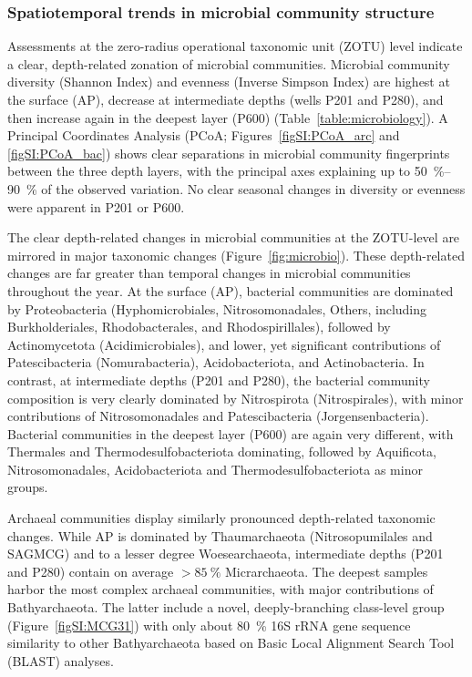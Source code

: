 \subsubsection{Spatiotemporal trends in microbial community structure}
Assessments at the zero-radius operational taxonomic unit (ZOTU) level indicate a clear, depth-related zonation of microbial communities.
Microbial community diversity (Shannon Index) and evenness (Inverse Simpson Index) are highest at the surface (AP), decrease at intermediate depths (wells P201 and P280), and then increase again in the deepest layer (P600) (Table~\ref{table:microbiology}).
A Principal Coordinates Analysis (PCoA; Figures~\ref{figSI:PCoA_arc} and \ref{figSI:PCoA_bac}) shows clear separations in microbial community fingerprints between the three depth layers, with the principal axes explaining up to \SIrange{50}{90}{\percent} of the observed variation.
No clear seasonal changes in diversity or evenness were apparent in P201 or P600.

The clear depth-related changes in microbial communities at the ZOTU-level are mirrored in major taxonomic changes (Figure~\ref{fig:microbio}).
These depth-related changes are far greater than temporal changes in microbial communities throughout the year.
At the surface (AP), bacterial communities are dominated by Proteobacteria (Hyphomicrobiales, Nitrosomonadales, Others, including Burkholderiales, Rhodobacterales, and Rhodospirillales), followed by Actinomycetota (Acidimicrobiales), and lower, yet significant contributions of Patescibacteria (Nomurabacteria), Acidobacteriota, and Actinobacteria.
In contrast, at intermediate depths (P201 and P280), the bacterial community composition is very clearly dominated by Nitrospirota (Nitrospirales), with minor contributions of Nitrosomonadales and Patescibacteria (Jorgensenbacteria).
Bacterial communities in the deepest layer (P600) are again very different, with Thermales and Thermodesulfobacteriota dominating, followed by Aquificota, Nitrosomonadales, Acidobacteriota and Thermodesulfobacteriota as minor groups.

Archaeal communities display similarly pronounced depth-related taxonomic changes.
While AP is dominated by Thaumarchaeota (Nitrosopumilales and SAGMCG) and to a lesser degree Woesearchaeota, intermediate depths (P201 and P280) contain on average $> \SI{85}{\percent}$ Micrarchaeota.
The deepest samples harbor the most complex archaeal communities, with major contributions of Bathyarchaeota.
The latter include a novel, deeply-branching class-level group (Figure~\ref{figSI:MCG31}) with only about \SI{80}{\percent} 16S rRNA gene sequence similarity to other Bathyarchaeota based on Basic Local Alignment Search Tool (BLAST) analyses. 


